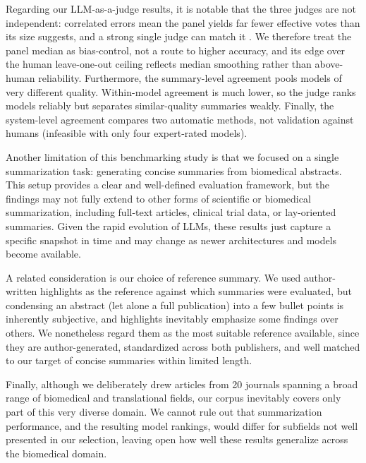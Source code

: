 Regarding our LLM-as-a-judge results, it is notable that the three judges are not independent: correlated errors mean the panel yields far fewer effective votes than its size suggests, and a strong single judge can match it \citep{kohliNineJudgesTwo2026}. We therefore treat the panel median as bias-control, not a route to higher accuracy, and its edge over the human leave-one-out ceiling reflects median smoothing rather than above-human reliability. Furthermore, the summary-level agreement pools models of very different quality. Within-model agreement is much lower, so the judge ranks models reliably but separates similar-quality summaries weakly. Finally, the system-level agreement compares two automatic methods, not validation against humans (infeasible with only four expert-rated models).

Another limitation of this benchmarking study is that we focused on a single summarization task: generating concise summaries from biomedical abstracts. This setup provides a clear and well-defined evaluation framework, but the findings may not fully extend to other forms of scientific or biomedical summarization, including full-text articles, clinical trial data, or lay-oriented summaries. Given the rapid evolution of \acp{LLM}, these results just capture a specific snapshot in time and may change as newer architectures and models become available.

A related consideration is our choice of reference summary. We used author-written highlights as the reference against which summaries were evaluated, but condensing an abstract (let alone a full publication) into a few bullet points is inherently subjective, and highlights inevitably emphasize some findings over others. We nonetheless regard them as the most suitable reference available, since they are author-generated, standardized across both publishers, and well matched to our target of concise summaries within limited length.

Finally, although we deliberately drew articles from 20 journals spanning a broad range of biomedical and translational fields, our corpus inevitably covers only part of this very diverse domain. We cannot rule out that summarization performance, and the resulting model rankings, would differ for subfields not well presented in our selection, leaving open how well these results generalize across the biomedical domain.
